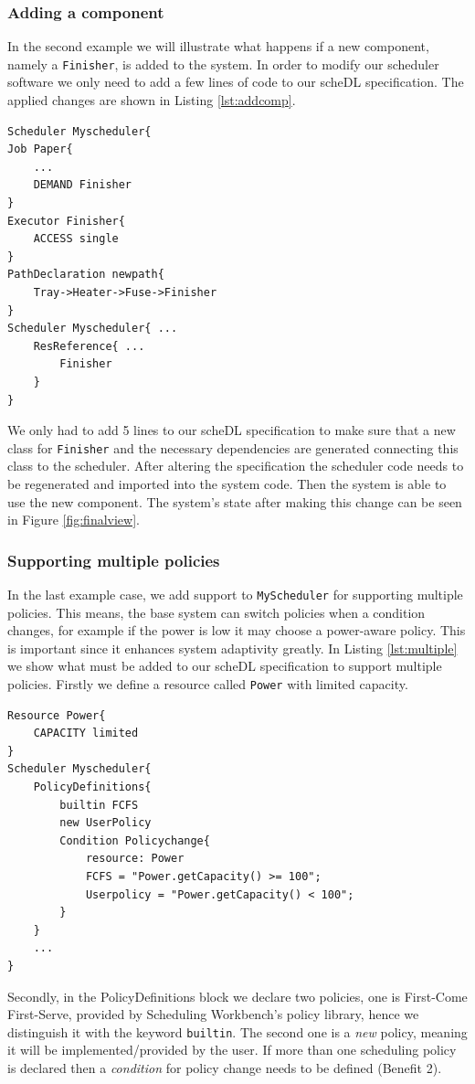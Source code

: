 	\subsubsection{Adding a component}
	In the second example we will illustrate what happens if a new component, namely a
	\texttt{Finisher}, is added to the system. In order to modify our scheduler
	software we only need to add a few lines of code to our \textsf{scheDL}
	specification. The applied changes are shown in Listing \ref{lst:addcomp}.
\begin{lstlisting}[caption={Extra code for adding a component.},label={lst:addcomp}]
Scheduler Myscheduler{
Job Paper{ 
	...
	DEMAND Finisher 
} 
Executor Finisher{ 
	ACCESS single 
} 
PathDeclaration newpath{ 
	Tray->Heater->Fuse->Finisher 
} 
Scheduler Myscheduler{ ...
	ResReference{ ...
		Finisher 
	} 
}
\end{lstlisting}
	We only had to add 5 lines to our \textsf{scheDL} specification to
	make sure 
	that a new class for \texttt{Finisher} and the necessary dependencies
	are generated connecting this class to the scheduler. After altering the
	specification the scheduler code needs to be regenerated and imported into the system code.
	Then the system is able to use the new component. The system's state after
	making this change can be seen in Figure \ref{fig:finalview}.
	
	\subsubsection{Supporting multiple policies}
	In the last example case, we add support to \texttt{MyScheduler} for supporting
	multiple policies. This means, the base system can switch policies when a
	condition changes, for example if the power is low it may choose a power-aware
	policy. This is important since it enhances system adaptivity greatly. In
	Listing \ref{lst:multiple} we show what must be added to our \textsf{scheDL} specification
	to support multiple policies. Firstly we define a resource called
	\texttt{Power} with limited capacity.
\begin{lstlisting}[caption={Extra code for supporting multiple policies.},label={lst:multiple}] 
Resource Power{
	CAPACITY limited
}
Scheduler Myscheduler{
	PolicyDefinitions{
		builtin FCFS
		new UserPolicy
		Condition Policychange{
			resource: Power
			FCFS = "Power.getCapacity() >= 100";
			Userpolicy = "Power.getCapacity() < 100";
		}
	}
	...
}
\end{lstlisting}
	Secondly, in the PolicyDefinitions block we declare two policies, one is First-Come
	First-Serve, provided by Scheduling Workbench's policy library, hence we
	distinguish it with the keyword \texttt{builtin}. The second one is a \emph{new}
	policy, meaning it will be implemented/provided by the user. If more than one
	scheduling policy is declared then a \emph{condition} for policy change needs to
	be defined (Benefit 2).
	
